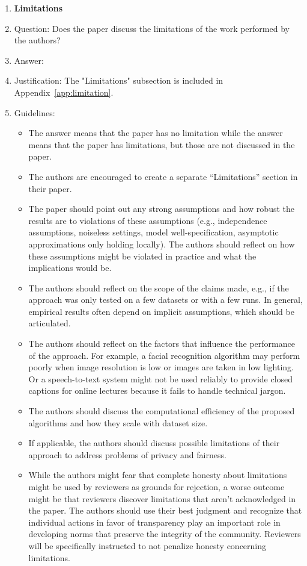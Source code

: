 \documentclass{article}
\begin{document}
\begin{enumerate}
\item {\bf Limitations}
    \item[] Question: Does the paper discuss the limitations of the work performed by the authors?
    \item[] Answer: \answerYes{} %
    \item[] Justification: The "Limitations" subsection is included in Appendix~\ref{app:limitation}.
    \item[] Guidelines:
    \begin{itemize}
        \item The answer \answerNA{} means that the paper has no limitation while the answer \answerNo{} means that the paper has limitations, but those are not discussed in the paper. 
        \item The authors are encouraged to create a separate ``Limitations'' section in their paper.
        \item The paper should point out any strong assumptions and how robust the results are to violations of these assumptions (e.g., independence assumptions, noiseless settings, model well-specification, asymptotic approximations only holding locally). The authors should reflect on how these assumptions might be violated in practice and what the implications would be.
        \item The authors should reflect on the scope of the claims made, e.g., if the approach was only tested on a few datasets or with a few runs. In general, empirical results often depend on implicit assumptions, which should be articulated.
        \item The authors should reflect on the factors that influence the performance of the approach. For example, a facial recognition algorithm may perform poorly when image resolution is low or images are taken in low lighting. Or a speech-to-text system might not be used reliably to provide closed captions for online lectures because it fails to handle technical jargon.
        \item The authors should discuss the computational efficiency of the proposed algorithms and how they scale with dataset size.
        \item If applicable, the authors should discuss possible limitations of their approach to address problems of privacy and fairness.
        \item While the authors might fear that complete honesty about limitations might be used by reviewers as grounds for rejection, a worse outcome might be that reviewers discover limitations that aren't acknowledged in the paper. The authors should use their best judgment and recognize that individual actions in favor of transparency play an important role in developing norms that preserve the integrity of the community. Reviewers will be specifically instructed to not penalize honesty concerning limitations.
    \end{itemize}


\end{enumerate}
\end{document}
